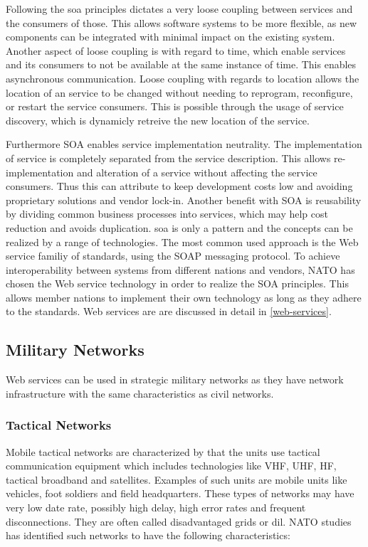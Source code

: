 \documentclass[USenglish]{ifimaster}
\begin{document}
Following the \gls{soa} principles dictates a very loose coupling between
services and the consumers of those. This allows software systems to be more
flexible, as new components can be integrated with minimal impact on the
existing system. Another aspect of loose coupling is with regard to time, which
enable services and its consumers to not be available at the same instance of
time. This enables asynchronous communication. Loose coupling with regards to
location allows the location of an service to be changed without needing to
reprogram, reconfigure, or restart the service consumers. This is possible
through the usage of service discovery, which is dynamicly retreive the new
location of the service.

Furthermore SOA enables service implementation neutrality. The implementation of
service is completely separated from the service description. This allows
re-implementation and alteration of a service without affecting the service
consumers. Thus this can attribute to keep development costs low and avoiding
proprietary solutions and vendor lock-in. Another benefit with SOA is
reusability by dividing common business processes into services, which may help
cost reduction and avoids duplication. \gls{soa} is only a pattern and the
concepts can be realized by a range of technologies. The most common used
approach is the Web service familiy of standards, using the SOAP messaging
protocol. To achieve interoperability between systems from different nations and
vendors, NATO has chosen the Web service technology in order to realize the SOA
principles. This allows member nations to implement their own technology as long
as they adhere to the standards. Web services are are discussed in detail in
\cref{web-services}.

\subsection{Military Networks}
Web services can be used in strategic military networks as they have network
infrastructure with the same characteristics as civil networks.

\subsubsection{Tactical Networks}
Mobile tactical networks are characterized by that the units use tactical
communication equipment which includes technologies like VHF, UHF, HF, tactical
broadband and satellites. Examples of such units are mobile units like vehicles,
foot soldiers and field headquarters. These types of networks may have very low
date rate, possibly high delay, high error rates and frequent disconnections.
They are often called disadvantaged grids or \gls{dil}. NATO studies has
identified such networks to have the following characteristics:
\end{document}
